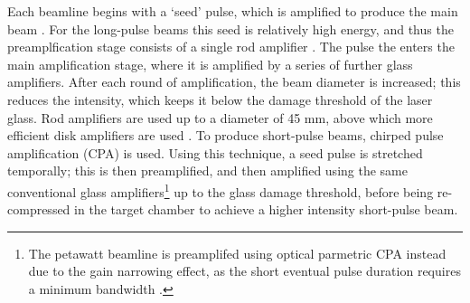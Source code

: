 Each beamline begins with a `seed' pulse, which is amplified to produce the main beam \cite{Ross1981}. For the long-pulse beams this seed is relatively high energy, and thus the preamplfication stage consists of a single rod amplifier \cite{Springate2010}. The pulse the enters the main amplification stage, where it is amplified by a series of further glass amplifiers. After each round of amplification, the beam diameter is increased; this reduces the intensity, which keeps it below the damage threshold of the laser glass. Rod amplifiers are used up to a diameter of 45 \unit{\milli\meter}, above which more efficient disk amplifiers are used \cite{Springate2010}. To produce short-pulse beams, chirped pulse amplification (CPA) \cite{Strickland1985} is used. Using this technique, a seed pulse is stretched temporally; this is then preamplified, and then amplified using the same conventional glass amplifiers\footnote{The petawatt beamline is preamplifed using optical parmetric CPA \cite{Ross1997,Hernandez-Gomez2006, Musgrave2015} instead due to the gain narrowing effect, as the short eventual pulse duration requires a minimum bandwidth \cite{Danson2004}.} up to the glass damage threshold, before being re-compressed in the target chamber to achieve a higher intensity short-pulse beam. 



